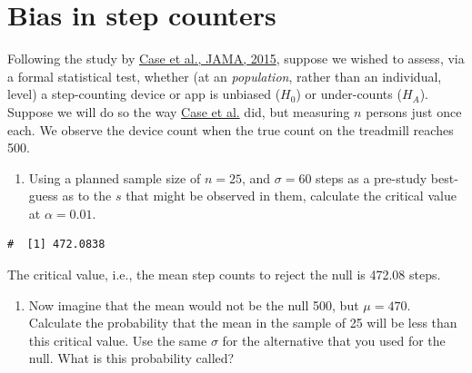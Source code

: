 \documentclass[letterpaper,11pt,twoside,]{pinp}
\providecommand{\tightlist}{%
  \setlength{\itemsep}{0pt}\setlength{\parskip}{0pt}}
\begin{document}
\hypertarget{bias-in-step-counters}{%
\section{Bias in step counters}\label{bias-in-step-counters}}

Following the study by
\href{http://www.medicine.mcgill.ca/epidemiology/hanley/bios601/Surveys/SmartphoneSteps.pdf}{Case
et al., JAMA, 2015}, suppose we wished to assess, via a formal
statistical test, whether (at an \textit{population}, rather than an
individual, level) a step-counting device or app is unbiased (\(H_0\))
or under-counts (\(H_A\)). Suppose we will do so the way
\href{http://www.medicine.mcgill.ca/epidemiology/hanley/bios601/Surveys/SmartphoneSteps.pdf}{Case
et al.} did, but measuring \(n\) persons just once each. We observe the
device count when the true count on the treadmill reaches 500.

\begin{enumerate}
\def\labelenumi{\alph{enumi}.}
\tightlist
\item
  Using a planned sample size of \(n=25\), and \(\sigma = 60\) steps as
  a pre-study best-guess as to the \(s\) that might be observed in them,
  calculate the critical value at \(\alpha = 0.01\).
\end{enumerate}

\begin{Shaded}
\begin{Highlighting}[]
\NormalTok{(} \NormalTok{, } \NormalTok{, } \SpecialCharTok{/}\NormalTok{(}\NormalTok{))}
\end{Highlighting}
\end{Shaded}

\begin{ShadedResult}
\begin{verbatim}
#  [1] 472.0838
\end{verbatim}
\end{ShadedResult}

The critical value, i.e., the mean step counts to reject the null is
472.08 steps.

\begin{enumerate}
\def\labelenumi{\alph{enumi}.}
\setcounter{enumi}{1}
\tightlist
\item
  Now imagine that the mean would not be the null 500, but \(\mu=470.\)
  Calculate the probability that the mean in the sample of 25 will be
  less than this critical value. Use the same \(\sigma\) for the
  alternative that you used for the null. What is this probability
  called?
\end{enumerate}
\end{document}

